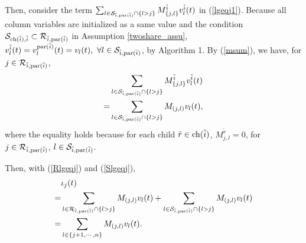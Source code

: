 \documentclass[journal]{IEEEtran}
\begin{document}
\par Then, consider the term $\sum_{l\in \mathcal{S}_{\tilde{i},{\rm par}(\tilde{i})}\cap \{l>j\}} M_{\{j,l\}}^{\tilde{i}} v_{l}^{\tilde{i}}(t)$ in (\ref{lgeqj1}).
Because all column variables are initialized as a same value and the condition $\mathcal{S}_{{\rm ch}(\tilde{i}),\tilde{i}}\subset \mathcal{R}_{\tilde{i},{\rm par}(\tilde{i})}$ in Assumption \ref{twoshare_assu}, $v_l^{\tilde{i}}(t)=v_l^{{\rm par}(\tilde{i})}(t)=v_l(t), \ \forall  l\in \mathcal{S}_{\tilde{i},{\rm par}(\tilde{i})}$, by Algorithm 1. By (\ref{msum}), we have, for $j\in \mathcal{R}_{\tilde{i},{\rm par}(\tilde{i})}$,
\begin{align}\label{Slgeqj}
&\sum_{l\in \mathcal{S}_{\tilde{i},{\rm par}(\tilde{i})}\cap \{l>j\}}M_{\{j,l\}}^{\tilde{i}}v_l^{\tilde{i}}(t)\notag\\
=&\sum_{l\in \mathcal{S}_{\tilde{i},{\rm par}(\tilde{i})}\cap \{l>j\}}M_{(j,l)}v_l(t),
\end{align}
where the equality holds because for each child $\tilde{r}\in {\rm ch}(\tilde{i})$, $M^{\tilde{r}}_{j,l}=0$, for $j\in \mathcal{R}_{\tilde{i},{\rm par}(\tilde{i})}$, $l\in \mathcal{S}_{\tilde{i},{\rm par}(\tilde{i})}$.
\par Then, with (\ref{Rlgeqj}) and (\ref{Slgeqj}), 
\begin{align}\label{lgeqj}
&\iota_j(t)\notag\\
=&\sum_{l\in  \mathcal{R}_{\tilde{i},{\rm par}(\tilde{i})} \cap \{l>j\}} M_{(j,l)}v_l(t)+\sum_{l\in \mathcal{S}_{\tilde{i},{\rm par}(\tilde{i})}\cap \{l>j\}}M_{(j,l)}v_l(t)\notag\\
=&\sum_{l\in \{j+1,\cdots,n\}} M_{(j,l)}v_l(t).
\end{align}
\end{document}
